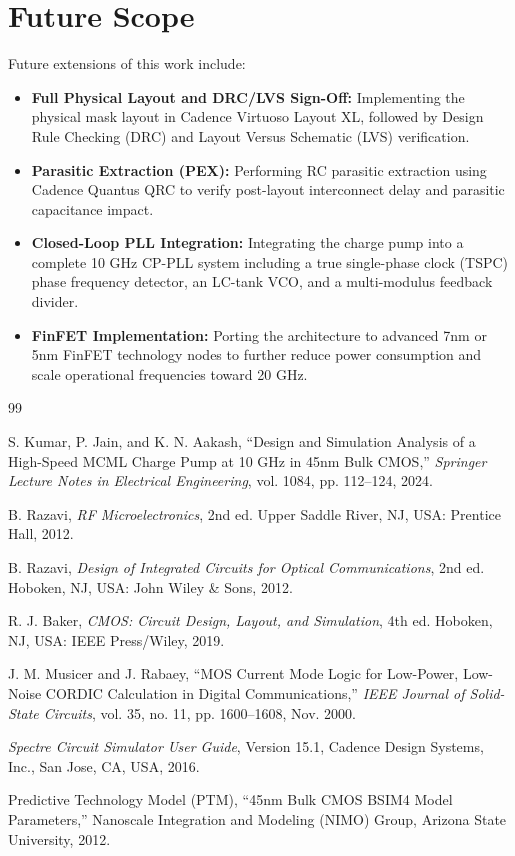 \documentclass[11pt,a4paper]{report}
\begin{document}
\section{Future Scope}
Future extensions of this work include:
\begin{itemize}
    \item \textbf{Full Physical Layout and DRC/LVS Sign-Off:} Implementing the physical mask layout in Cadence Virtuoso Layout XL, followed by Design Rule Checking (DRC) and Layout Versus Schematic (LVS) verification.
    \item \textbf{Parasitic Extraction (PEX):} Performing RC parasitic extraction using Cadence Quantus QRC to verify post-layout interconnect delay and parasitic capacitance impact.
    \item \textbf{Closed-Loop PLL Integration:} Integrating the charge pump into a complete 10 GHz CP-PLL system including a true single-phase clock (TSPC) phase frequency detector, an LC-tank VCO, and a multi-modulus feedback divider.
    \item \textbf{FinFET Implementation:} Porting the architecture to advanced 7nm or 5nm FinFET technology nodes to further reduce power consumption and scale operational frequencies toward 20 GHz.
\end{itemize}

\vspace{1.0cm}
\begin{thebibliography}{99}

S. Kumar, P. Jain, and K. N. Aakash, ``Design and Simulation Analysis of a High-Speed MCML Charge Pump at 10 GHz in 45nm Bulk CMOS,'' \textit{Springer Lecture Notes in Electrical Engineering}, vol. 1084, pp. 112--124, 2024.

B. Razavi, \textit{RF Microelectronics}, 2nd ed. Upper Saddle River, NJ, USA: Prentice Hall, 2012.

B. Razavi, \textit{Design of Integrated Circuits for Optical Communications}, 2nd ed. Hoboken, NJ, USA: John Wiley \& Sons, 2012.

R. J. Baker, \textit{CMOS: Circuit Design, Layout, and Simulation}, 4th ed. Hoboken, NJ, USA: IEEE Press/Wiley, 2019.

J. M. Musicer and J. Rabaey, ``MOS Current Mode Logic for Low-Power, Low-Noise CORDIC Calculation in Digital Communications,'' \textit{IEEE Journal of Solid-State Circuits}, vol. 35, no. 11, pp. 1600--1608, Nov. 2000.

\textit{Spectre Circuit Simulator User Guide}, Version 15.1, Cadence Design Systems, Inc., San Jose, CA, USA, 2016.

Predictive Technology Model (PTM), ``45nm Bulk CMOS BSIM4 Model Parameters,'' Nanoscale Integration and Modeling (NIMO) Group, Arizona State University, 2012.

\end{thebibliography}
\end{document}
